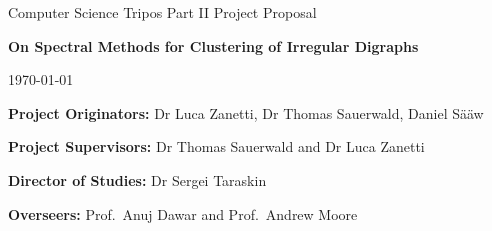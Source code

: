 \documentclass[a4paper,12pt]{article}
\begin{document}
\medskip
{}
\medskip
{}

\vfil

\centerline{\large Computer Science Tripos Part II Project Proposal}
\vspace{0.4in}
\centerline{\Large \textbf{On Spectral Methods for Clustering of Irregular Digraphs}}
\vspace{0.3in}
\centerline{\large \today}

\vfil

\textbf{Project Originators:} Dr Luca Zanetti, Dr Thomas Sauerwald, Daniel Sääw

\vspace{0.5in}

\textbf{Project Supervisors:} Dr Thomas Sauerwald and Dr Luca Zanetti

\vspace{0.5in}

{\bf Director of Studies:} Dr Sergei Taraskin

\vspace{0.5in}

{\bf Overseers:} Prof.\ Anuj Dawar and Prof.\ Andrew Moore

\vspace{0.5in}

\vfil
\eject
\end{document}

